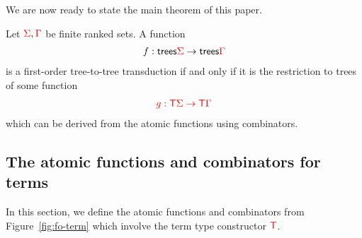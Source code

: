 We are now ready to state the main theorem of this paper. 

\begin{theorem}\label{thm:main}
    Let ${\color{red}{\Sigma}},{\color{red}{\Gamma}}$ be finite ranked sets. A function 
    \begin{align*}
        f : \mathsf {trees} {\color{red}{\Sigma}} \to \mathsf {trees} {\color{red}{\Gamma}}
    \end{align*}
    is a first-order tree-to-tree transduction if and only if it is the restriction to trees of some  function
    \begin{align*}
        {\color{red}{g : {\color{red}{\mathsf T}}\Sigma \to {\color{red}{\mathsf T}}\Gamma}}
    \end{align*}
    which can be derived from the atomic functions using combinators.
\end{theorem}








\subsection{The atomic functions and combinators for terms}
\label{sec:atomic-and-combinators}
In this section, we define the atomic functions and combinators from Figure~\ref{fig:fo-term} which involve the term type constructor ${\color{red}{\mathsf T}}$. 





